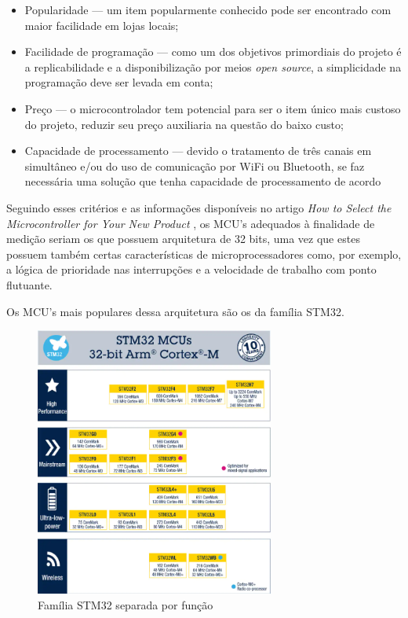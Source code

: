 \begin{itemize}
    \item Popularidade --- um item popularmente conhecido pode ser encontrado com maior facilidade em lojas locais;
    \item Facilidade de programação --- como um dos objetivos primordiais do projeto é a replicabilidade e a disponibilização por meios \textit{open source}, a simplicidade na programação deve ser levada em conta;
    \item Preço --- o microcontrolador tem potencial para ser o item único mais custoso do projeto, reduzir seu preço auxiliaria na questão do baixo custo;
    \item Capacidade de processamento --- devido o tratamento de três canais em simultâneo e/ou do uso de comunicação por WiFi ou Bluetooth, se faz necessária uma solução que tenha capacidade de processamento de acordo
\end{itemize}

Seguindo esses critérios e as informações disponíveis no artigo \textit{How to Select the Microcontroller for Your New Product} \cite{select_uC}, os \gls{MCU}'s adequados à finalidade de medição seriam os que possuem arquitetura de 32 bits, uma vez que estes possuem também certas características de microprocessadores como, por exemplo, a lógica de prioridade nas interrupções e a velocidade de trabalho com ponto flutuante.

Os \gls{MCU}'s mais populares dessa arquitetura são os da família STM32.

\begin{figure}[htb]
    \caption{Família STM32 separada por função}
    \label{fig:stm32-family}
    \includegraphics[width=0.7\textwidth]{figuras/STM32-family.png}
\end{figure}

